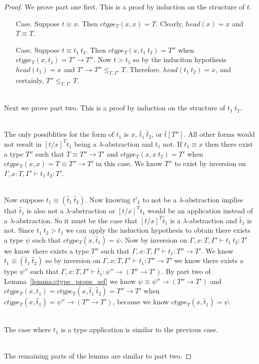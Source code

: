 \begin{proof}
  We prove part one first. This is a proof by induction on the structure of $t$.

\begin{itemize}
\item[Case.] Suppose $t \equiv x$.  Then $ctype_T(x,x) = T$.  Clearly,
  $head(x) = x$ and $T \equiv T$.
  
\item[Case.] Suppose $t \equiv t_1\ t_2$.  Then $ctype_T(x,t_1\ t_2) = T''$
  when $ctype_T(x,t_1) = T' \to T''$.  Now $t > t_1$ so by the induciton
  hypothesis $head(t_1) = x$ and $T' \to T'' \leq_{\Gamma,\Gamma'} T$.
  Therefore, $head(t_1\ t_2) = x$, and certainly, $T'' \leq_{\Gamma,\Gamma'} T$.
\end{itemize}

\ \\
Next we prove part two.  This is a proof by induction on the structure of $t_1\ t_2$.

\ \\
The only possiblities for the form of $t_1$ is $x$, $\hat{t}_1\ \hat{t}_2$, or $\hat{t}[T'']$.  All other 
forms would not result in $[t/x]^T t_1$ being a $\lambda$-abstraction and $t_1$ not.
If $t_1 \equiv x$ then there exist a type $T''$ such that $T \equiv T'' \to T'$ and
$ctype_T(x,x\ t_2) = T'$ when $ctype_T(x,x) = T \equiv T'' \to T'$ in this case.  We know
$T''$ to exist by inversion on $\Gamma,x:T,\Gamma' \vdash t_1\ t_2:T'$.

\ \\
Now suppose $t_1 \equiv (\hat{t}_1\ \hat{t}_2)$.  Now knowing $t'_1$ to not be a $\lambda$-abstraction
implies that $\hat{t}_1$ is also not a $\lambda$-abstraction or $[t/x]^T t_1$ would be an application
instead of a $\lambda$-abstraction.  So it must be the case that $[t/x]^T \hat{t}_1$ is a $\lambda$-abstraction
and $\hat{t}_1$ is not.  Since $t_1\ t_2 > t_1$ we can apply the induction hypothesis to obtain there exists
a type $\psi$ such that $ctype_T(x,\hat{t}_1) = \psi$.  
Now by inversion on $\Gamma,x:T,\Gamma' \vdash t_1\ t_2:T'$ we know there exists a type $T''$ such that
$\Gamma,x:T,\Gamma' \vdash t_1:T'' \to T'$.  We know $t_1 \equiv (\hat{t}_1\ \hat{t}_2)$ so by inversion on
$\Gamma,x:T,\Gamma' \vdash t_1:T'' \to T'$ we know there exists a type $\psi''$ such that
$\Gamma,x:T,\Gamma' \vdash \hat{t}_1:\psi'' \to (T'' \to T')$.
By part two of Lemma~\ref{lemma:ctype_props_ssf} we know $\psi \equiv \psi'' \to (T'' \to T')$ and
$ctype_T(x,t_1) = ctype_T(x,\hat{t}_1\ \hat{t}_2) = T'' \to T'$ 
when $ctype_T(x,\hat{t}_1) = \psi'' \to (T'' \to T')$, because we know $ctype_T(x,\hat{t}_1) = \psi$.

\ \\
The case where $t_1$ is a type application is similar to the previous case.

\ \\
The remaining parts of the lemma are similar to part two.
\end{proof}

